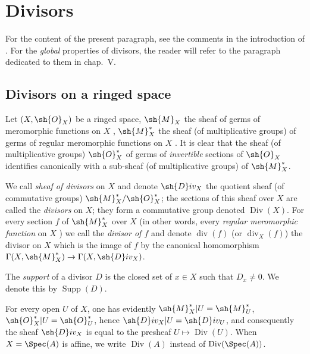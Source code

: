 \section{Divisors}
\label{section:IV.21}

For the content of the present paragraph, see the comments in the introduction of .
For the \emph{global} properties of divisors, the reader will refer to the paragraph dedicated to them in chap.~V.

\subsection{Divisors on a ringed space}
\label{IV.21.1}

\begin{env}[21.1.1]
\label{IV.21.1.1}
Let $(X,\sh{O}_X)$ be a ringed space, $\sh{M}_X$ the sheaf of germs of meromorphic functions on $X$ , $\sh{M}_X^*$ the sheaf (of multiplicative groups) of germs of regular meromorphic functions on $X$ .
It is clear that the sheaf (of multiplicative groups) $\sh{O}_X^*$ of germs of \emph{invertible} sections of $\sh{O}_X$ identifies canonically with a sub-sheaf (of multiplicative groups) of $\sh{M}_X^*$.
\end{env}

\begin{definition}[21.1.2]
\label{IV.21.1.2}
We call \emph{sheaf of divisors} on $X$ and denote $\sh{D}iv_X$ the quotient sheaf (of commutative groups) $\sh{M}_X^*/\sh{O}_X^*$;
the sections of this sheaf over $X$ are called the \emph{divisors} on $X$;
they form a commutative group denoted $\operatorname{Div}(X)$.
For every section $f$ of $\sh{M}_X^*$ over $X$ (in other words, every \emph{regular meromorphic function} on $X$ ) we call the \emph{divisor of $f$} and denote $\operatorname{div}(f)$ (or $\operatorname{div}_X(f)$) the divisor on $X$ which is the image of $f$ by the canonical homomorphism $\Gamma(X,\sh{M}_X^*)\to\Gamma(X,\sh{D}iv_X)$.
\end{definition}

The \emph{support} of a divisor $D$ is the closed set of $x\in X$ such that $D_x\neq 0$.
We denote this by $\operatorname{Supp}(D)$.

For every open $U$ of $X$, one has evidently $\sh{M}_X^*|U=\sh{M}_U^*$, $\sh{O}_X^*|U=\sh{O}_U^*$, hence $\sh{D}iv_X|U=\sh{D}iv_U$, and consequently the sheaf $\sh{D}iv_X$ is equal to the presheaf $U\mapsto\operatorname{Div}(U)$.
When $X=\Spec(A)$ is affine, we write $\operatorname{Div}(A)$ instead of $\operatorname{Div}(\Spec(A))$.

